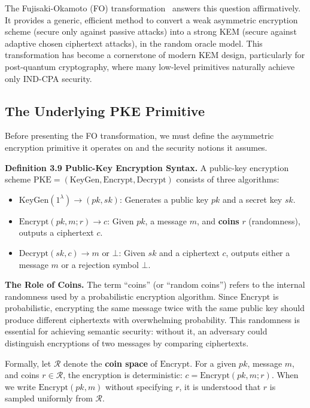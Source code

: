 The Fujisaki-Okamoto (FO) transformation~\cite{fujisaki1999secure} answers this question affirmatively. It provides a generic, efficient method to convert a weak asymmetric encryption scheme (secure only against passive attacks) into a strong KEM (secure against adaptive chosen ciphertext attacks), in the random oracle model. This transformation has become a cornerstone of modern KEM design, particularly for post-quantum cryptography, where many low-level primitives naturally achieve only IND-CPA security.

\subsection{The Underlying PKE Primitive}

Before presenting the FO transformation, we must define the asymmetric encryption primitive it operates on and the security notions it assumes.

\noindent\textbf{Definition 3.9 Public-Key Encryption Syntax.} A public-key encryption scheme $\text{PKE} = (\text{KeyGen}, \text{Encrypt}, \text{Decrypt})$ consists of three algorithms:
\begin{itemize}
    \item $\text{KeyGen}(1^\lambda) \to (pk, sk)$: Generates a public key $pk$ and a secret key $sk$.
    \item $\text{Encrypt}(pk, m; r) \to c$: Given $pk$, a message $m$, and \textbf{coins} $r$ (randomness), outputs a ciphertext $c$.
    \item $\text{Decrypt}(sk, c) \to m \text{ or } \bot$: Given $sk$ and a ciphertext $c$, outputs either a message $m$ or a rejection symbol $\bot$.
\end{itemize}

\noindent\textbf{The Role of Coins.} The term ``coins'' (or ``random coins'') refers to the internal randomness used by a probabilistic encryption algorithm. Since $\text{Encrypt}$ is probabilistic, encrypting the same message twice with the same public key should produce different ciphertexts with overwhelming probability. This randomness is essential for achieving semantic security: without it, an adversary could distinguish encryptions of two messages by comparing ciphertexts.

Formally, let $\mathcal{R}$ denote the \textbf{coin space} of $\text{Encrypt}$. For a given $pk$, message $m$, and coins $r \in \mathcal{R}$, the encryption is deterministic: $c = \text{Encrypt}(pk, m; r)$. When we write $\text{Encrypt}(pk, m)$ without specifying $r$, it is understood that $r$ is sampled uniformly from $\mathcal{R}$.

